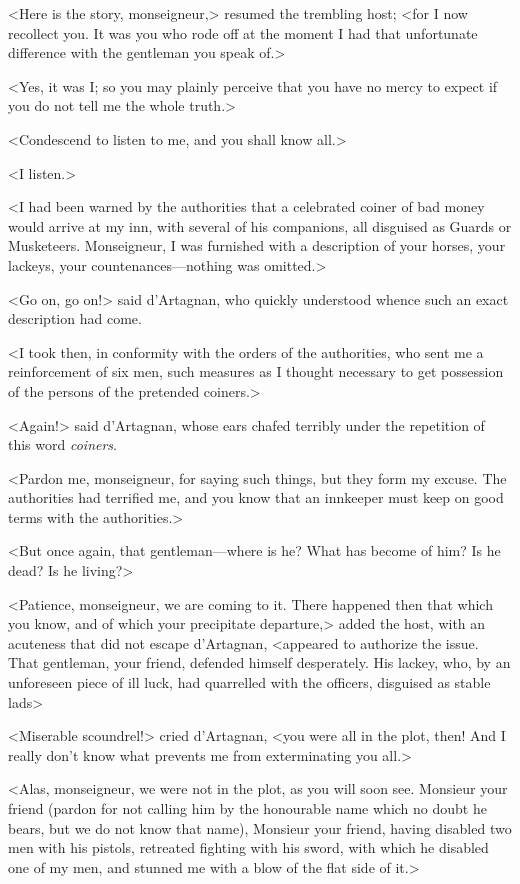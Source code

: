 <Here is the story, monseigneur,> resumed the trembling host; <for I now recollect you. It was you who rode off at the moment I had that unfortunate difference with the gentleman you speak of.> 

<Yes, it was I; so you may plainly perceive that you have no mercy to expect if you do not tell me the whole truth.> 

<Condescend to listen to me, and you shall know all.> 

<I listen.> 

<I had been warned by the authorities that a celebrated coiner of bad money would arrive at my inn, with several of his companions, all disguised as Guards or Musketeers. Monseigneur, I was furnished with a description of your horses, your lackeys, your countenances---nothing was omitted.> 

<Go on, go on!> said d'Artagnan, who quickly understood whence such an exact description had come. 

<I took then, in conformity with the orders of the authorities, who sent me a reinforcement of six men, such measures as I thought necessary to get possession of the persons of the pretended coiners.> 

<Again!> said d'Artagnan, whose ears chafed terribly under the repetition of this word \textit{coiners}. 

<Pardon me, monseigneur, for saying such things, but they form my excuse. The authorities had terrified me, and you know that an innkeeper must keep on good terms with the authorities.> 

<But once again, that gentleman---where is he? What has become of him? Is he dead? Is he living?> 

<Patience, monseigneur, we are coming to it. There happened then that which you know, and of which your precipitate departure,> added the host, with an acuteness that did not escape d'Artagnan, <appeared to authorize the issue. That gentleman, your friend, defended himself desperately. His lackey, who, by an unforeseen piece of ill luck, had quarrelled with the officers, disguised as stable lads\longdash> 

<Miserable scoundrel!> cried d'Artagnan, <you were all in the plot, then! And I really don't know what prevents me from exterminating you all.> 

<Alas, monseigneur, we were not in the plot, as you will soon see. Monsieur your friend (pardon for not calling him by the honourable name which no doubt he bears, but we do not know that name), Monsieur your friend, having disabled two men with his pistols, retreated fighting with his sword, with which he disabled one of my men, and stunned me with a blow of the flat side of it.> 


